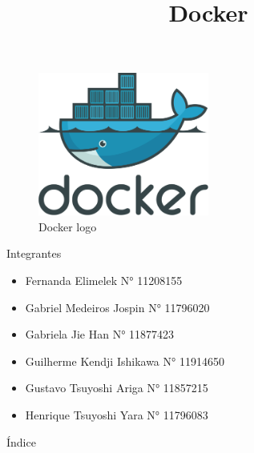 \documentclass{beamer}
\title {Docker}
\institute {Universidade de São Paulo}
\begin{document}
\begin{frame}{\titlepage}
	\begin{figure}[htpb]
		\centering
		\includegraphics[width=0.5\textwidth]{./assets/Docker_logo.png}
		\caption{Docker logo}
	\end{figure}
\end{frame}

\begin{frame}{Integrantes}
	\begin{itemize}
		\item Fernanda Elimelek N° 11208155
		\item Gabriel Medeiros Jospin N° 11796020
		\item Gabriela Jie Han N° 11877423
		\item Guilherme Kendji Ishikawa N° 11914650
		\item Gustavo Tsuyoshi Ariga N° 11857215
		\item Henrique Tsuyoshi Yara N° 11796083
	\end{itemize}
\end{frame}

\begin{frame}{Índice}
	\tableofcontents
\end{frame}







%
%
%
%
%
%
%

\end{document}

